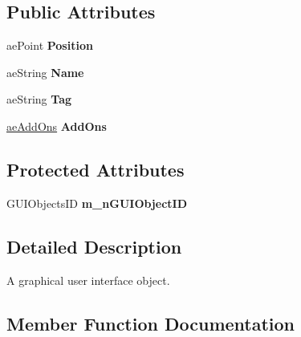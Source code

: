 \subsection*{Public Attributes}
\begin{DoxyCompactItemize}
\item 
ae\+Point {\bfseries Position}\hypertarget{classae_g_u_i_object_ac4d0c937ed1fbe0c27430a26b7140c4b}{}\label{classae_g_u_i_object_ac4d0c937ed1fbe0c27430a26b7140c4b}

\item 
ae\+String {\bfseries Name}\hypertarget{classae_g_u_i_object_acf409a193d1897123657ea8646de33de}{}\label{classae_g_u_i_object_acf409a193d1897123657ea8646de33de}

\item 
ae\+String {\bfseries Tag}\hypertarget{classae_g_u_i_object_ae95d430e3495e894f344dd8ec36231d8}{}\label{classae_g_u_i_object_ae95d430e3495e894f344dd8ec36231d8}

\item 
\hyperlink{_add_on_8h_a0f4072611b509766afe7bb36d570ac80}{ae\+Add\+Ons} {\bfseries Add\+Ons}\hypertarget{classae_g_u_i_object_a10f12fc957daf9baf020a099c29e0f6a}{}\label{classae_g_u_i_object_a10f12fc957daf9baf020a099c29e0f6a}

\end{DoxyCompactItemize}
\subsection*{Protected Attributes}
\begin{DoxyCompactItemize}
\item 
G\+U\+I\+Objects\+ID {\bfseries m\+\_\+n\+G\+U\+I\+Object\+ID}\hypertarget{classae_g_u_i_object_afffd1755f6b5e5f9795ccbac72e918c1}{}\label{classae_g_u_i_object_afffd1755f6b5e5f9795ccbac72e918c1}

\end{DoxyCompactItemize}


\subsection{Detailed Description}
A graphical user interface object. 

\subsection{Member Function Documentation}
